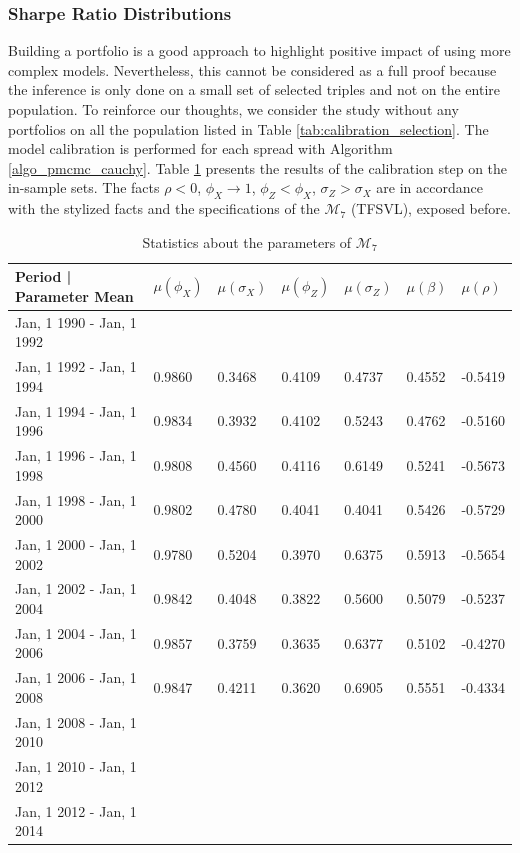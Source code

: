 \documentclass[11pt,a4,twosided,singlespacing,titlepagenumber=on]{scrreprt}
\numberwithin{equation}{chapter} %
\theoremstyle{remark}
\begin{document}
\subsubsection{Sharpe Ratio Distributions}
Building a portfolio is a good approach to highlight positive impact of using more complex models. Nevertheless, this cannot be considered as a full proof because the inference is only done on a small set of selected triples and not on the entire population. To reinforce our thoughts, we consider the study without any portfolios on all the population listed in Table \ref{tab:calibration_selection}. The model calibration is performed for each spread with Algorithm \ref{algo_pmcmc_cauchy}. Table \ref{tab:param_stats_1992_2014} presents the results of the calibration step on the in-sample sets. The facts $\rho < 0$, $\phi_X \rightarrow 1$, $\phi_Z<\phi_X$, $\sigma_Z > \sigma_X$ are in accordance with the stylized facts and the specifications of the $\mathcal{M}_7$ (TFSVL), exposed before. 

\begin{table}[H]
\centering
\begin{tabular}{lllllll}
\hline
\multicolumn{1}{|l|}{Period | Parameter Mean} & \multicolumn{1}{|l|}{$\mu(\phi_X)$} & \multicolumn{1}{|l|}{$\mu(\sigma_X)$} & \multicolumn{1}{|l|}{$\mu(\phi_Z)$} & \multicolumn{1}{|l|}{$\mu(\sigma_Z)$} & \multicolumn{1}{|l|}{$\mu(\beta)$} & \multicolumn{1}{|l|}{$\mu(\rho)$} \\ \hline
Jan, 1 1990 - Jan, 1 1992 &  & & & & &\\
Jan, 1 1992 - Jan, 1 1994 &  0.9860 & 0.3468 & 0.4109 & 0.4737 & 0.4552 & -0.5419 \\ 
Jan, 1 1994 - Jan, 1 1996 &  0.9834 & 0.3932 & 0.4102 & 0.5243 & 0.4762 & -0.5160 \\
Jan, 1 1996 - Jan, 1 1998 &  0.9808 & 0.4560 & 0.4116 & 0.6149 & 0.5241 & -0.5673 \\
Jan, 1 1998 - Jan, 1 2000 &  0.9802 & 0.4780 & 0.4041 & 0.4041 & 0.5426 & -0.5729 \\
Jan, 1 2000 - Jan, 1 2002 &  0.9780 & 0.5204 & 0.3970 & 0.6375 & 0.5913 & -0.5654 \\
Jan, 1 2002 - Jan, 1 2004 &  0.9842 & 0.4048 & 0.3822 & 0.5600 & 0.5079 & -0.5237 \\
Jan, 1 2004 - Jan, 1 2006 &  0.9857 & 0.3759 & 0.3635 & 0.6377 & 0.5102 & -0.4270 \\
Jan, 1 2006 - Jan, 1 2008 &  0.9847 & 0.4211 & 0.3620 & 0.6905 & 0.5551 & -0.4334 \\
Jan, 1 2008 - Jan, 1 2010 &  & & & & &\\
Jan, 1 2010 - Jan, 1 2012 &  & & & & &\\
Jan, 1 2012 - Jan, 1 2014 &  & & & & &\\
\hline
\end{tabular}
\caption{Statistics about the parameters of $\mathcal{M}_7$}
\label{tab:param_stats_1992_2014}
\end{table}
\end{document}
